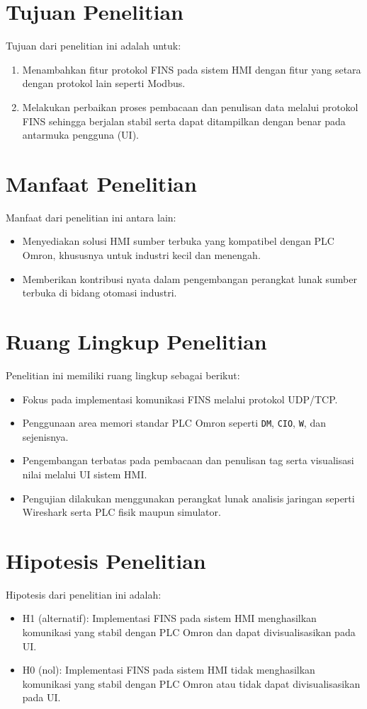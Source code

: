 \section{Tujuan Penelitian}
Tujuan dari penelitian ini adalah untuk:
\begin{enumerate}
    \item Menambahkan fitur protokol FINS pada sistem HMI dengan fitur yang setara dengan protokol lain seperti Modbus.
    \item Melakukan perbaikan proses pembacaan dan penulisan data melalui protokol FINS sehingga berjalan stabil serta dapat ditampilkan dengan benar pada antarmuka pengguna (UI).
\end{enumerate}

\section{Manfaat Penelitian}
Manfaat dari penelitian ini antara lain:
\begin{itemize}
    \item Menyediakan solusi HMI sumber terbuka yang kompatibel dengan PLC Omron, khususnya untuk industri kecil dan menengah.
    \item Memberikan kontribusi nyata dalam pengembangan perangkat lunak sumber terbuka di bidang otomasi industri.
\end{itemize}

\section{Ruang Lingkup Penelitian}
Penelitian ini memiliki ruang lingkup sebagai berikut:
\begin{itemize}
    \item Fokus pada implementasi komunikasi FINS melalui protokol UDP/TCP.
    \item Penggunaan area memori standar PLC Omron seperti \texttt{DM}, \texttt{CIO}, \texttt{W}, dan sejenisnya.
    \item Pengembangan terbatas pada pembacaan dan penulisan tag serta visualisasi nilai melalui UI sistem HMI.
    \item Pengujian dilakukan menggunakan perangkat lunak analisis jaringan seperti Wireshark serta PLC fisik maupun simulator.
\end{itemize}

\section{Hipotesis Penelitian}
Hipotesis dari penelitian ini adalah:
\begin{itemize}
    \item H1 (alternatif): Implementasi FINS pada sistem HMI menghasilkan komunikasi yang stabil dengan PLC Omron dan dapat divisualisasikan pada UI.
    \item H0 (nol): Implementasi FINS pada sistem HMI tidak menghasilkan komunikasi yang stabil dengan PLC Omron atau tidak dapat divisualisasikan pada UI.
\end{itemize}


